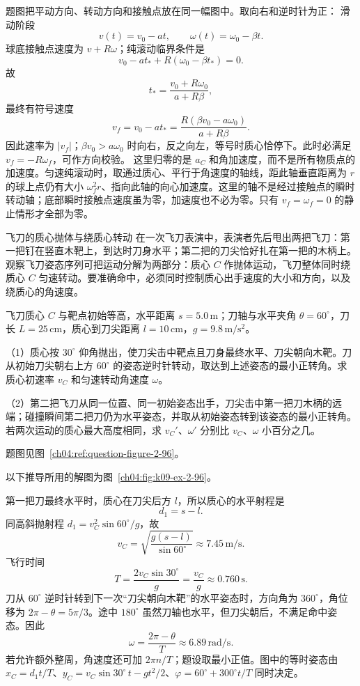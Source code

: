 {\begin{xesolution}
题图把平动方向、转动方向和接触点放在同一幅图中。取向右和逆时针为正：
\RollingBallDiagram
滑动阶段
\[
v(t)=v_0-at,\qquad \omega(t)=\omega_0-\beta t.
\]
球底接触点速度为 $v+R\omega$；纯滚动临界条件是
\[
v_0-at_*+R(\omega_0-\beta t_*)=0.
\]
故
\[
t_*=\frac{v_0+R\omega_0}{a+R\beta},
\]
最终有符号速度
\[
\boxed{v_f=v_0-at_*
=\frac{R(\beta v_0-a\omega_0)}{a+R\beta}}.
\]
因此速率为 $|v_f|$；$\beta v_0>a\omega_0$ 时向右，反之向左，等号时质心恰停下。此时必满足 $v_f=-R\omega_f$，可作方向校验。
这里归零的是 $a_C$ 和角加速度，而不是所有物质点的加速度。匀速纯滚动时，取通过质心、平行于角速度的轴线，距此轴垂直距离为 $r$ 的球上点仍有大小 $\omega_f^2r$、指向此轴的向心加速度。这里的轴不是经过接触点的瞬时转动轴；底部瞬时接触点速度虽为零，加速度也不必为零。只有 $v_f=\omega_f=0$ 的静止情形才全部为零。
\end{xesolution}


\begin{origexamplebox}{飞刀的质心抛体与绕质心转动}\label{ch04:ex:k09-2-96}
在一次飞刀表演中，表演者先后甩出两把飞刀：第一把钉在竖直木靶上，到达时刀身水平；第二把的刀尖恰好扎在第一把的木柄上。观察飞刀姿态序列可把运动分解为两部分：质心 $C$ 作抛体运动，飞刀整体同时绕质心 $C$ 匀速转动。要准确命中，必须同时控制质心出手速度的大小和方向，以及绕质心的角速度。\par
飞刀质心 $C$ 与靶点初始等高，水平距离 $s=5.0\,\mathrm m$；刀轴与水平夹角 $\theta=60^\circ$，刀长 $L=25\,\mathrm{cm}$，质心到刀尖距离 $l=10\,\mathrm{cm}$，$g=9.8\,\mathrm{m/s^2}$。\par
（1）质心按 $30^\circ$ 仰角抛出，使刀尖击中靶点且刀身最终水平、刀尖朝向木靶。刀从初始刀尖朝右上方 $60^\circ$ 的姿态逆时针转动，取达到上述姿态的最小正转角。求质心初速率 $v_C$ 和匀速转动角速度 $\omega$。\par
（2）第二把飞刀从同一位置、同一初始姿态出手，刀尖击中第一把刀木柄的远端；碰撞瞬间第二把刀仍为水平姿态，并取从初始姿态转到该姿态的最小正转角。若两次运动的质心最大高度相同，求 $v_C'$、$\omega'$ 分别比 $v_C$、$\omega$ 小百分之几。
\par 题图见图~\ref{ch04:ref:question-figure-2-96}。
\KQuestionDS
\end{origexamplebox}
\begin{xesolution}
以下推导所用的解图为图~\ref{ch04:fig:k09-ex-2-96}。

第一把刀最终水平时，质心在刀尖后方 $l$，所以质心的水平射程是
\KnifeFlightDiagram
\[
d_1=s-l.
\]
同高斜抛射程 $d_1=v_C^2\sin60^\circ/g$，故
\[
\boxed{v_C=\sqrt{\frac{g(s-l)}{\sin60^\circ}}
\approx7.45\,\mathrm{m/s}}.
\]
飞行时间
\[
T=\frac{2v_C\sin30^\circ}{g}=\frac{v_C}{g}\approx0.760\,\mathrm s.
\]
刀从 $60^\circ$ 逆时针转到下一次“刀尖朝向木靶”的水平姿态时，方向角为 $360^\circ$，角位移为 $2\pi-\theta=5\pi/3$。途中 $180^\circ$ 虽然刀轴也水平，但刀尖朝后，不满足命中姿态。因此
\[
\boxed{\omega=\frac{2\pi-\theta}{T}\approx6.89\,\mathrm{rad/s}}.
\]
若允许额外整周，角速度还可加 $2\pi n/T$；题设取最小正值。图中的等时姿态由 $x_C=d_1t/T$、$y_C=v_C\sin30^\circ\,t-gt^2/2$、$\varphi=60^\circ+300^\circ t/T$ 同时决定。


\end{xesolution}}
